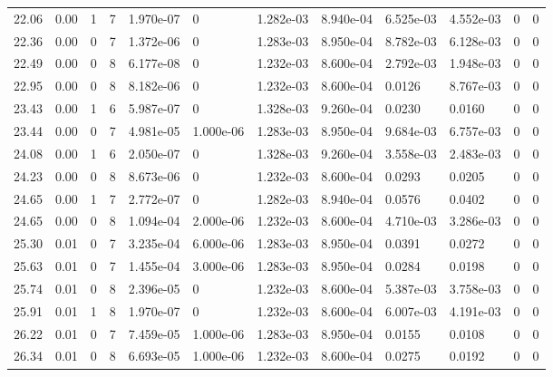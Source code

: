 \documentclass[preview]{standalone}
\begin{document}
{{{\begin{tabular}{L{1.2cm}C{1.2cm} C{0.3cm}C{0.5cm} C{1.4cm}C{1.4cm} C{1.4cm}C{1.4cm} C{1.6cm}C{1.6cm} C{1.6cm}C{1.6cm}}
  22.06  &  0.00  & 1     &  7 &  1.970e-07  & 0  &  1.282e-03&   8.940e-04& 6.525e-03 & 4.552e-03   &  0 & 0  \\ 
  22.36  &  0.00  & 0     &  7 &  1.372e-06  & 0  &  1.283e-03&   8.950e-04& 8.782e-03 & 6.128e-03   &  0 & 0  \\ 
  22.49  &  0.00  & 0     &  8 &  6.177e-08  & 0  &  1.232e-03&   8.600e-04& 2.792e-03 & 1.948e-03   &  0 & 0  \\ 
  22.95  &  0.00  & 0     &  8 &  8.182e-06  & 0  &  1.232e-03&   8.600e-04& 0.0126 & 8.767e-03   &  0 & 0  \\ 
  23.43  &  0.00  & 1     &  6 &  5.987e-07  & 0  &  1.328e-03&   9.260e-04& 0.0230 & 0.0160   &  0 & 0  \\ 
  23.44  &  0.00  & 0     &  7 &  4.981e-05  & 1.000e-06  &  1.283e-03&   8.950e-04& 9.684e-03 & 6.757e-03   &  0 & 0  \\ 
  24.08  &  0.00  & 1     &  6 &  2.050e-07  & 0  &  1.328e-03&   9.260e-04& 3.558e-03 & 2.483e-03   &  0 & 0  \\ 
  24.23  &  0.00  & 0     &  8 &  8.673e-06  & 0  &  1.232e-03&   8.600e-04& 0.0293 & 0.0205   &  0 & 0  \\ 
  24.65  &  0.00  & 1     &  7 &  2.772e-07  & 0  &  1.282e-03&   8.940e-04& 0.0576 & 0.0402   &  0 & 0  \\ 
  24.65  &  0.00  & 0     &  8 &  1.094e-04  & 2.000e-06  &  1.232e-03&   8.600e-04& 4.710e-03 & 3.286e-03   &  0 & 0  \\ 
  25.30  &  0.01  & 0     &  7 &  3.235e-04  & 6.000e-06  &  1.283e-03&   8.950e-04& 0.0391 & 0.0272   &  0 & 0  \\ 
  25.63  &  0.01  & 0     &  7 &  1.455e-04  & 3.000e-06  &  1.283e-03&   8.950e-04& 0.0284 & 0.0198   &  0 & 0  \\ 
  25.74  &  0.01  & 0     &  8 &  2.396e-05  & 0  &  1.232e-03&   8.600e-04& 5.387e-03 & 3.758e-03   &  0 & 0  \\ 
  25.91  &  0.01  & 1     &  8 &  1.970e-07  & 0  &  1.232e-03&   8.600e-04& 6.007e-03 & 4.191e-03   &  0 & 0  \\ 
  26.22  &  0.01  & 0     &  7 &  7.459e-05  & 1.000e-06  &  1.283e-03&   8.950e-04& 0.0155 & 0.0108   &  0 & 0  \\ 
  26.34  &  0.01  & 0     &  8 &  6.693e-05  & 1.000e-06  &  1.232e-03&   8.600e-04& 0.0275 & 0.0192   &  0 & 0  \\ 
\hline 
\end{tabular} 

}}}
\end{document}
